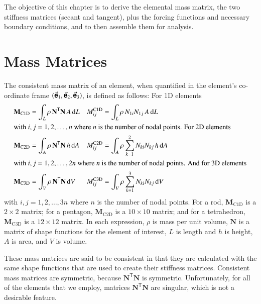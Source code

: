 The objective of this chapter is to derive the elemental mass matrix, the two stiffness matrices (secant and tangent), plus the forcing functions and necessary boundary conditions, and to then assemble them for analysis. 

\section{Mass Matrices}

The consistent mass matrix of an element, \cite{Archer65} when quantified in the element's co-ordinate frame $( \vec{\boldsymbol{\mathsf{e}}}_1 , \vec{\boldsymbol{\mathsf{e}}}_2 , \vec{\boldsymbol{\mathsf{e}}}_3 )$, is defined as follows:  For 1D elements
\begin{subequations}
    \label{consistentMassMatrix}
    \begin{align}
    \mathbf{M}_{\mathrm{C1D}} & = \int_{L} \rho \, \mathbf{N}^{\mathsf{T}} \mathbf{N} \,
    A \, \mathrm{d} L & M^{\mathrm{C1D}}_{ij} & = 
    \int_L \rho \, N_{1i} N_{1j} \, A \, \mathrm{d} L
    \label{consistentMassMatrix1D} \\
    \intertext{with $i,j = 1, 2, \ldots , n$ where $n$ is the number of nodal points. For 2D elements}
    \mathbf{M}_{\mathrm{C2D}} & = \int_{A} \rho \, \mathbf{N}^{\mathsf{T}} \mathbf{N} \,
    h \, \mathrm{d} A & M^{\mathrm{C2D}}_{ij} & =
    \int_A \rho \sum_{k=1}^2 N_{ki} N_{kj} \, h \, \mathrm{d} A
    \label{consistentMassMatrix2D} \\
    \intertext{with $i,j = 1 , 2, \ldots , 2n$ where $n$ is the number of nodal points.  And for 3D elements}
    \mathbf{M}_{\mathrm{C3D}} & = \int_{V} \rho \, \mathbf{N}^{\mathsf{T}} \mathbf{N} \,
    \mathrm{d} V & M^{\mathrm{C3D}}_{ij} & = 
    \int_V \rho \sum_{k=1}^3 N_{ki} N_{kj} \, \mathrm{d} V
    \label{consistentMassMatrix3D}
    \end{align}
\end{subequations}
with $i, j = 1, 2, \ldots , 3n$ where $n$ is the number of nodal points.  For a rod, $\mathbf{M}_{\mathrm{C1D}}$ is a $2 \! \times \! 2$ matrix; for a pentagon, $\mathbf{M}_{\mathrm{C2D}}$ is a $10 \! \times \! 10$ matrix; and for a tetrahedron, $\mathbf{M}_{\mathrm{C3D}}$ is a $12 \! \times \! 12$ matrix.  In each expression, $\rho$ is mass per unit volume, $\mathbf{N}$ is a matrix of shape functions for the element of interest, $L$ is length and $h$ is height, $A$ is area, and $V$ is volume.  

These mass matrices are said to be consistent in that they are calculated with the same shape functions that are used to create their stiffness matrices.  Consistent mass matrices are symmetric, because $\mathbf{N}^{\mathsf{T}} \mathbf{N}$ is symmetric.  Unfortunately, for all of the elements that we employ, matrices $\mathbf{N}^{\mathsf{T}} \mathbf{N}$ are singular, which is not a desirable feature.

